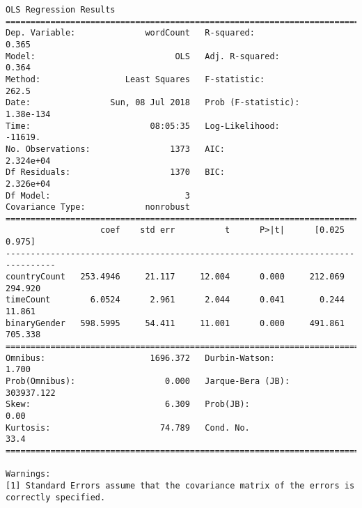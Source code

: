 \documentclass[11pt]{article}
\begin{document}
    \begin{Verbatim}[commandchars=\\\{\}]
                            OLS Regression Results                            
==============================================================================
Dep. Variable:              wordCount   R-squared:                       0.365
Model:                            OLS   Adj. R-squared:                  0.364
Method:                 Least Squares   F-statistic:                     262.5
Date:                Sun, 08 Jul 2018   Prob (F-statistic):          1.38e-134
Time:                        08:05:35   Log-Likelihood:                -11619.
No. Observations:                1373   AIC:                         2.324e+04
Df Residuals:                    1370   BIC:                         2.326e+04
Df Model:                           3                                         
Covariance Type:            nonrobust                                         
================================================================================
                   coef    std err          t      P>|t|      [0.025      0.975]
--------------------------------------------------------------------------------
countryCount   253.4946     21.117     12.004      0.000     212.069     294.920
timeCount        6.0524      2.961      2.044      0.041       0.244      11.861
binaryGender   598.5995     54.411     11.001      0.000     491.861     705.338
==============================================================================
Omnibus:                     1696.372   Durbin-Watson:                   1.700
Prob(Omnibus):                  0.000   Jarque-Bera (JB):           303937.122
Skew:                           6.309   Prob(JB):                         0.00
Kurtosis:                      74.789   Cond. No.                         33.4
==============================================================================

Warnings:
[1] Standard Errors assume that the covariance matrix of the errors is correctly specified.

    \end{Verbatim}
\end{document}
